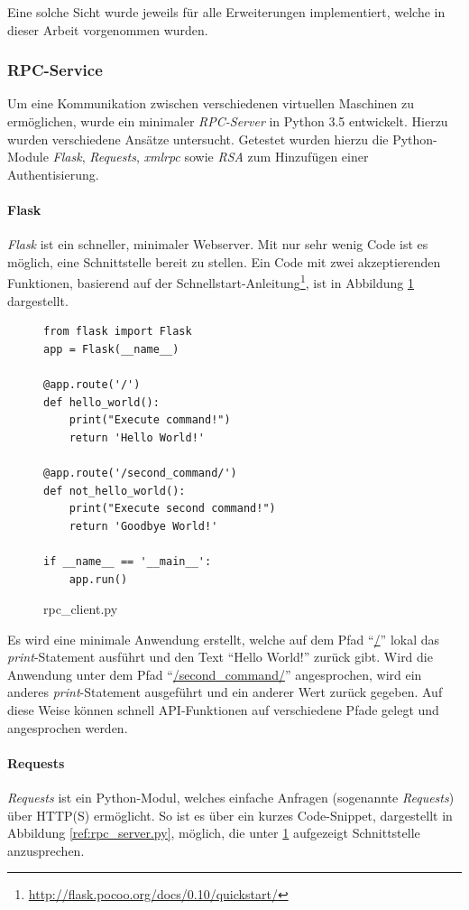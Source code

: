 Eine solche Sicht wurde jeweils für alle Erweiterungen implementiert, welche in dieser Arbeit vorgenommen wurden.

\newpage
\subsubsection{RPC-Service}\label{ref:XMLRPC}
Um eine Kommunikation zwischen verschiedenen virtuellen Maschinen zu ermöglichen, wurde ein minimaler \textit{RPC-Server} in Python 3.5 entwickelt. Hierzu wurden verschiedene Ansätze untersucht. Getestet wurden hierzu die Python-Module \textit{Flask}, \textit{Requests}, \textit{xmlrpc} sowie \textit{RSA} zum Hinzufügen einer Authentisierung.

\paragraph{Flask}\label{ref:flask}
\textit{Flask} ist ein schneller, minimaler Webserver. Mit nur sehr wenig Code ist es möglich, eine Schnittstelle bereit zu stellen. Ein Code mit zwei akzeptierenden Funktionen, basierend auf der Schnellstart-Anleitung\footnote{\url{http://flask.pocoo.org/docs/0.10/quickstart/}}, ist in Abbildung \ref{ref:rpc_client.py} dargestellt.\\

\begin{figure}
\begin{lstlisting}
from flask import Flask
app = Flask(__name__)

@app.route('/')
def hello_world():
    print("Execute command!")
    return 'Hello World!'
    
@app.route('/second_command/')
def not_hello_world():
    print("Execute second command!")
    return 'Goodbye World!'

if __name__ == '__main__':
    app.run()
\end{lstlisting}
\caption{rpc\_client.py}
\label{ref:rpc_client.py}
\end{figure}

Es wird eine minimale Anwendung erstellt, welche auf dem Pfad "`\url{/}"' lokal das \textit{print}-Statement ausführt und den Text "`Hello World!"' zurück gibt. Wird die Anwendung unter dem Pfad "`\url{/second_command/}"' angesprochen, wird ein anderes \textit{print}-Statement ausgeführt und ein anderer Wert zurück gegeben. Auf diese Weise können schnell API-Funktionen auf verschiedene Pfade gelegt und angesprochen werden.

\newpage
\paragraph{Requests}
\textit{Requests} ist ein Python-Modul, welches einfache Anfragen (sogenannte \textit{Requests}) über HTTP(S) ermöglicht. So ist es über ein kurzes Code-Snippet, dargestellt in Abbildung \ref{ref:rpc_server.py}, möglich, die unter \ref{ref:rpc_client.py} aufgezeigt Schnittstelle anzusprechen.\\

